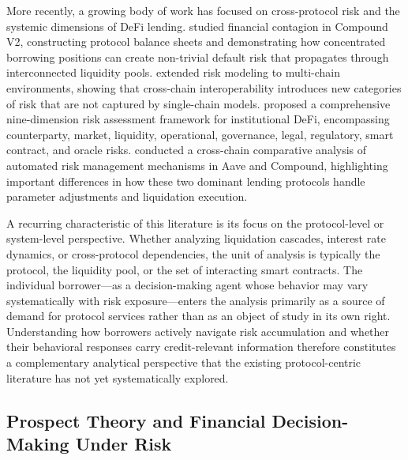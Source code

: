 More recently, a growing body of work has focused on cross-protocol risk and the systemic dimensions of DeFi lending. \citet{tovanich2023contagion} studied financial contagion in Compound V2, constructing protocol balance sheets and demonstrating how concentrated borrowing positions can create non-trivial default risk that propagates through interconnected liquidity pools. \citet{sevim2026interoperability} extended risk modeling to multi-chain environments, showing that cross-chain interoperability introduces new categories of risk that are not captured by single-chain models. \citet{oberholzer2026toward} proposed a comprehensive nine-dimension risk assessment framework for institutional DeFi, encompassing counterparty, market, liquidity, operational, governance, legal, regulatory, smart contract, and oracle risks. \citet{iftikhar2025automated} conducted a cross-chain comparative analysis of automated risk management mechanisms in Aave and Compound, highlighting important differences in how these two dominant lending protocols handle parameter adjustments and liquidation execution.

A recurring characteristic of this literature is its focus on the protocol-level or system-level perspective. Whether analyzing liquidation cascades, interest rate dynamics, or cross-protocol dependencies, the unit of analysis is typically the protocol, the liquidity pool, or the set of interacting smart contracts. The individual borrower—as a decision-making agent whose behavior may vary systematically with risk exposure—enters the analysis primarily as a source of demand for protocol services rather than as an object of study in its own right. Understanding how borrowers actively navigate risk accumulation and whether their behavioral responses carry credit-relevant information therefore constitutes a complementary analytical perspective that the existing protocol-centric literature has not yet systematically explored.

\subsection{Prospect Theory and Financial Decision-Making Under Risk}

